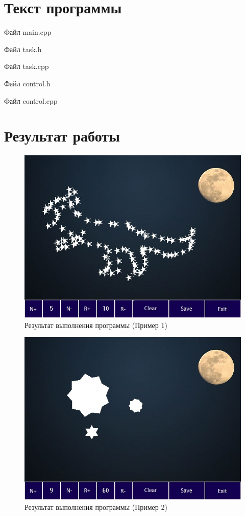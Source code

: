\documentclass[14pt, a4paper]{extreport}
\begin{document}
\chapter{Текст программы}

\noindent Файл main.cpp

\pagebreak
\hrulefill

\noindent Файл task.h

\hrulefill

\noindent Файл task.cpp

\hrulefill

\noindent Файл control.h

\hrulefill

\noindent Файл control.cpp


\chapter{Результат работы}

\begin{figure}[h!]
	\centering
	\includegraphics[width = 12cm]{image/image1}
  \caption{Результат выполнения программы (Пример 1)}
\end{figure}

\begin{figure}[h!]
	\centering
	\includegraphics[width = 12cm]{image/image2}
  \caption{Результат выполнения программы (Пример 2)}
\end{figure}

\end{document}
